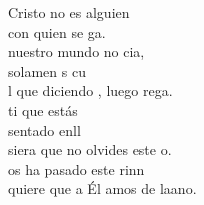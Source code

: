 \documentclass[12pt]{article}
\begin{document}
\begin{multicols*}{2}
\begin{cancion}
	 Cristo no es alguien \\
	con quien se ga.\\
	 nuestro mundo no cia, \\
	solamen s cu  \\
	l que diciendo , luego rega.\\
\jump
	ti que estás \\
	sentado enll  \\
	siera que no olvides este o.\\
	os ha pasado  este rinn \\
	quiere que a Él amos de laano.\\
\end{cancion}%


\end{multicols*}
\end{document}
